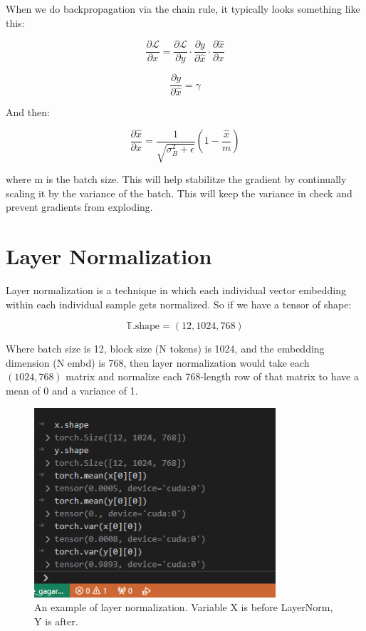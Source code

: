 \documentclass[12pt]{article}
\begin{document}
When we do backpropagation via the chain rule, it typically looks something like this: 

\[\frac{\partial \mathcal{L}}{\partial x} = \frac{\partial \mathcal{L}}{\partial y} \cdot \frac{\partial y}{\partial \hat{x}} \cdot \frac{\partial \hat{x}}{\partial x}\]

\[\frac{\partial y}{\partial \hat{x}}  = \gamma\]

And then:

\[\frac{\partial \hat{x}}{\partial x} = \frac{1}{\sqrt{\sigma_B^2 + \epsilon}}\left(1 - \frac{\hat{x}}{m} \right)\]

where m is the batch size. This will help stabilitze the gradient by continually scaling it by the variance of the batch. This will keep the variance in check and prevent gradients from exploding. 

\section{Layer Normalization}
Layer normalization is a technique in which each individual vector embedding within each individual sample gets normalized.  So if we have a tensor of shape:

\[\mathbb{T}\text{.shape} = (12, 1024, 768)\]

Where batch size is 12, block size (N tokens) is 1024, and the embedding dimension (N embd) is 768, then layer normalization would take each \((1024, 768)\) matrix and normalize each 768-length row of that matrix to have a mean of 0 and a variance of 1.

\begin{figure}[H]
    \centering
    \includegraphics[width=0.8\textwidth]{./layer_norm_ex.png} %
    \caption{An example of layer normalization. Variable X is before LayerNorm, Y is after.}
\end{figure}
\end{document}
